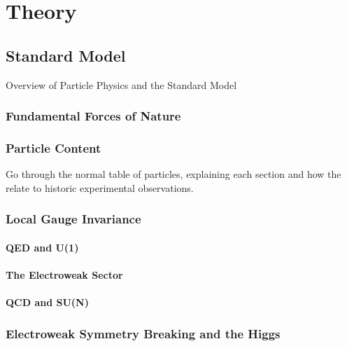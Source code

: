 
\chapter{Theory}

\ifpdf
    \graphicspath{{Chapter2/Figs/Raster/}{Chapter2/Figs/PDF/}{Chapter2/Figs/}}
\else
    \graphicspath{{Chapter2/Figs/Vector/}{Chapter2/Figs/}}
\fi


\section{Standard Model}  %
\label{sec:theory_standard_model_intro}

Overview of Particle Physics and the Standard Model

\subsection{Fundamental Forces of Nature}

\subsection{Particle Content}
Go through the normal table of particles, explaining each section and how the relate 
to historic experimental observations.

\subsection{Local Gauge Invariance}
\subsubsection{QED and U(1)}
\subsubsection{The Electroweak Sector}
\subsubsection{QCD and SU(N)}

\subsection{Electroweak Symmetry Breaking and the Higgs}

